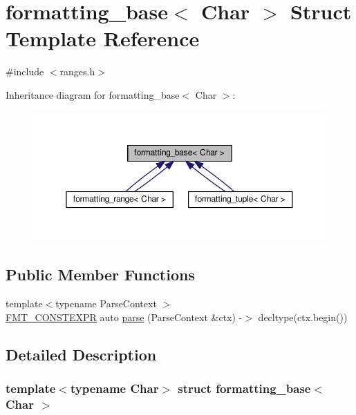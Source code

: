 \hypertarget{structformatting__base}{}\section{formatting\+\_\+base$<$ Char $>$ Struct Template Reference}
\label{structformatting__base}


{\ttfamily \#include $<$ranges.\+h$>$}



Inheritance diagram for formatting\+\_\+base$<$ Char $>$\+:
\nopagebreak
\begin{figure}[H]
\begin{center}
\leavevmode
\includegraphics[width=350pt]{structformatting__base__inherit__graph}
\end{center}
\end{figure}
\subsection*{Public Member Functions}
\begin{DoxyCompactItemize}
\item 
{\footnotesize template$<$typename Parse\+Context $>$ }\\\hyperlink{core_8h_a69201cb276383873487bf68b4ef8b4cd}{F\+M\+T\+\_\+\+C\+O\+N\+S\+T\+E\+X\+PR} auto \hyperlink{structformatting__base_a938ab5ae1cf866f08caa3314d779c03e}{parse} (Parse\+Context \&ctx) -\/$>$ decltype(ctx.\+begin())
\end{DoxyCompactItemize}


\subsection{Detailed Description}
\subsubsection*{template$<$typename Char$>$\newline
struct formatting\+\_\+base$<$ Char $>$}



